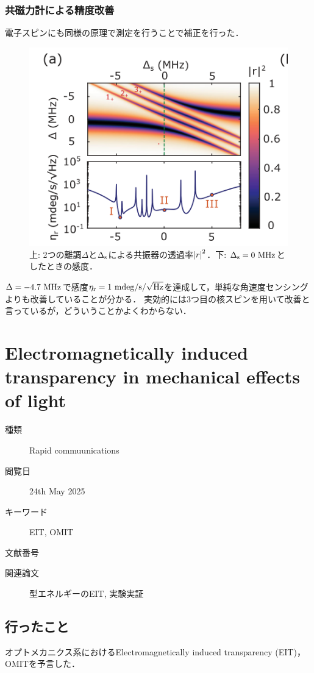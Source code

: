 \documentclass{report}
\begin{document}
      \subsection{共磁力計による精度改善}
        電子スピンにも同様の原理で測定を行うことで補正を行った．
        \begin{figure}[H]
          \centering
          \includegraphics[width = 0.5\linewidth]{./src/Cavity-Enhanced_Solid-State_Nuclear_Spin_Gyroscope/3_a.png}
          \caption{上: 2つの離調$\Delta$と$\Delta_{\mathrm{s}}$による共振器の透過率$\abs{r}^2$．下: $\Delta_{\r{s}} = 0\ \r{MHz}$としたときの感度．}
        \end{figure}
        $\Delta = -4.7\ \mathrm{MHz}$で感度$\eta_{\r{r}} = 1\ \r{mdeg/s/\sqrt{Hz}}$を達成して，単純な角速度センシングよりも改善していることが分かる．
        実効的には3つ目の核スピンを用いて改善と言っているが，どういうことかよくわからない．
  \chapter{Electromagnetically induced transparency in mechanical effects of light}
    \begin{boxnote}
      \begin{description}
        \item[種類] Rapid commuunications
        \item[閲覧日] 24th May 2025
        \item[キーワード] EIT, OMIT
        \item[文献番号] \cite{PhysRevA.81.041803}
        \item[関連論文] \Lambda 型エネルギーのEIT\cite{PhysRevLett.84.5094}, 実験実証\cite{science.1195596}
      \end{description}
    \end{boxnote}
    \section{行ったこと}
      オプトメカニクス系におけるElectromagnetically induced transparency (EIT)，OMITを予言した．
\end{document}
